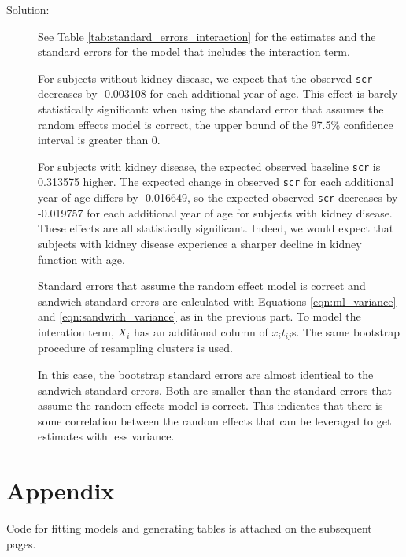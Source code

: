 \documentclass[11pt, letterpaper]{article}
\begin{document}
\begin{enumerate}[(a)]


\begin{description}
\item[Solution:] See Table \ref{tab:standard_errors_interaction} for the
  estimates and the standard errors for the model that includes the interaction
  term.

  For subjects without kidney disease, we expect that the observed \texttt{scr}
  decreases by -0.003108 for each additional year of age. This effect is barely
  statistically significant: when using the standard error that assumes the
  random effects model is correct, the upper bound of the 97.5\% confidence
  interval is greater than 0.
  
  For subjects with kidney disease, the expected observed baseline \texttt{scr}
  is 0.313575 higher. The expected change in observed \texttt{scr} for each
  additional year of age differs by -0.016649, so the expected observed
  \texttt{scr} decreases by -0.019757 for each additional year of age for
  subjects with kidney disease. These effects are all statistically
  significant. Indeed, we would expect that subjects with kidney disease
  experience a sharper decline in kidney function with age.

  Standard errors that assume the random effect model is correct and sandwich
  standard errors are calculated with Equations \ref{eqn:ml_variance} and
  \ref{eqn:sandwich_variance} as in the previous part. To model the interation
  term, $X_i$ has an additional column of $x_{i}t_{ij}$s. The same bootstrap
  procedure of resampling clusters is used.

  In this case, the bootstrap standard errors are almost identical to the
  sandwich standard errors. Both are smaller than the standard errors that
  assume the random effects model is correct. This indicates that there is some
  correlation between the random effects that can be leveraged to get estimates
  with less variance.
\end{description}

\end{enumerate}

\section*{Appendix}

Code for fitting models and generating tables is attached on the subsequent
pages.

\clearpage

\end{document}
